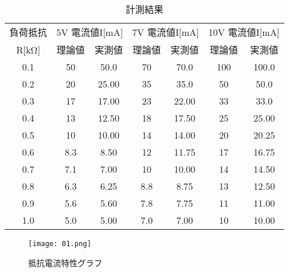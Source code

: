 \documentclass[titlepage]{jarticle}
\begin{document}
\begin{table}[H]
    \centering
    \label{tab:tab`le1}
    \caption{計測結果}
    \begin{tabular}{c|c|c|c|c|c|c|c} \hline \hline
        \multicolumn{2}{c|}{負荷抵抗} & \multicolumn{2}{c|}{5V 電流値I[mA]} 
        & \multicolumn{2}{c|}{7V 電流値I[mA]} & \multicolumn{2}{c}{10V 電流値I[mA]}\\\cline{3-8}
        \multicolumn{2}{c|}{R[kΩ]} & 理論値 & 実測値 & 理論値 & 実測値 & 理論値 & 実測値\\
    \hline
        \multicolumn{2}{c|}{0.1} & 50 & 50.0 & 70 & 70.0 & 100 & 100.0 \\\hline
        \multicolumn{2}{c|}{0.2} & 20 & 25.00 & 35 & 35.0 & 50 & 50.0 \\\hline
        \multicolumn{2}{c|}{0.3} & 17 & 17.00 & 23 & 22.00 & 33 & 33.0 \\ \hline
        \multicolumn{2}{c|}{0.4} & 13 & 12.50 & 18 & 17.50 & 25 & 25.00 \\ \hline
        \multicolumn{2}{c|}{0.5} & 10 & 10.00 & 14 & 14.00 & 20 & 20.25 \\ \hline
        \multicolumn{2}{c|}{0.6} & 8.3 & 8.50 & 12 & 11.75 & 17 & 16.75 \\ \hline
        \multicolumn{2}{c|}{0.7} & 7.1 & 7.00 & 10 & 10.00 & 14 & 14.50 \\ \hline
        \multicolumn{2}{c|}{0.8} & 6.3 & 6.25 & 8.8 & 8.75 & 13 & 12.50 \\ \hline
        \multicolumn{2}{c|}{0.9} & 5.6 & 5.60 & 7.8 & 7.75 & 11 & 11.00 \\ \hline
        \multicolumn{2}{c|}{1.0} & 5.0 & 5.00 & 7.0 & 7.00 & 10 & 10.00 \\ \hline
      \end{tabular}
\end{table}

\begin{figure}[H]
    \begin{center}
        \texttt{[image: 01.png]}
        \caption{抵抗電流特性グラフ}
    \end{center}
\end{figure}
\end{document}
